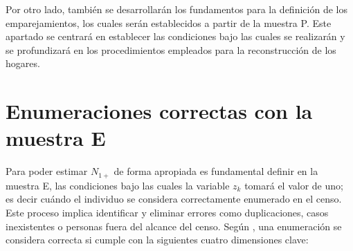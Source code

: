 \documentclass[
  12pt,
]{book}
\begin{document}
Por otro lado, también se desarrollarán los fundamentos para la definición de los emparejamientos, los cuales serán establecidos a partir de la muestra P. Este apartado se centrará en establecer las condiciones bajo las cuales se realizarán y se profundizará en los procedimientos empleados para la reconstrucción de los hogares.

\section{Enumeraciones correctas con la muestra E}\label{enumeraciones-correctas-con-la-muestra-e}

Para poder estimar \(N_{1+}\) de forma apropiada es fundamental definir en la muestra E, las condiciones bajo las cuales la variable \(z_{k}\) tomará el valor de uno; es decir cuándo el individuo se considera correctamente enumerado en el censo. Este proceso implica identificar y eliminar errores como duplicaciones, casos inexistentes o personas fuera del alcance del censo. Según \citet{hogan2003}, una enumeración se considera correcta si cumple con la siguientes cuatro dimensiones clave:
\end{document}
